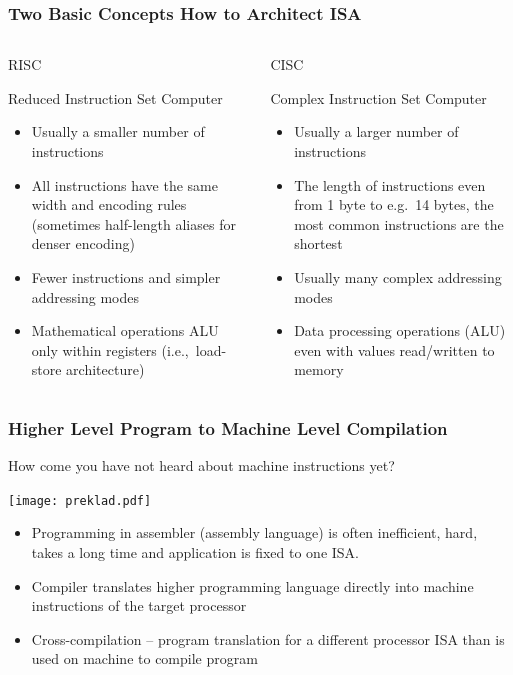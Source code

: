 \documentclass{beamer}
\begin{document}
\begin{frame}
\frametitle{Two Basic Concepts How to Architect ISA}

\begin{columns}
\begin{column}{0.5\textwidth}
\begin{center}
\LARGE{RISC}
\end{center}
Reduced Instruction Set Computer
\begin{itemize}
\item Usually a smaller number of instructions
\item All instructions have the same width and encoding rules (sometimes half-length aliases for denser encoding)
\item Fewer instructions and simpler addressing modes
\item Mathematical operations ALU only within registers (i.e.,\ load-store architecture)
\end{itemize}
\end{column}
\begin{column}{0.5\textwidth}  
\begin{center}
\LARGE{CISC}
\end{center}
Complex Instruction Set Computer
\begin{itemize}
\item Usually a larger number of instructions
\item The length of instructions even from 1 byte to e.g.\ 14 bytes, the most common instructions are the shortest
\item Usually many complex addressing modes
\item Data processing operations (ALU) even with values read/written to memory
\end{itemize}

\end{column}
\end{columns}
\end{frame}


\begin{frame}
\frametitle{Higher Level Program to Machine Level Compilation}

How come you have not heard about machine instructions yet?

\begin{center}
   \texttt{[image: preklad.pdf]}
\end{center}

\begin{itemize}
\item Programming in assembler (assembly language) is often inefficient, hard, takes a long time and application is fixed to one ISA.
\item Compiler translates higher programming language directly into machine instructions of the target processor
\item Cross-compilation -- program translation for a different processor ISA than is used on machine to compile program
\end{itemize}
\end{frame}
\end{document}
